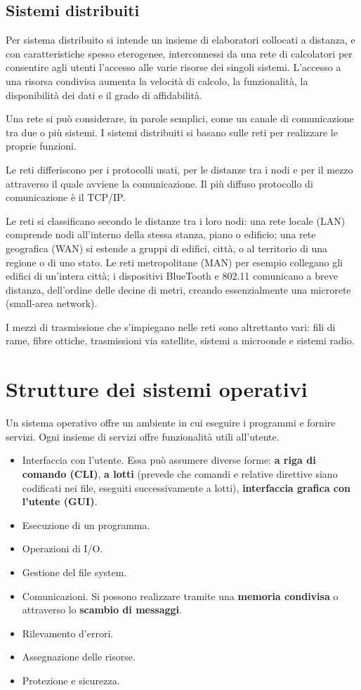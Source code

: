 \documentclass[11pt,a4paper]{article}
\begin{document}
\subsection{Sistemi distribuiti}
Per sistema distribuito si intende un insieme di elaboratori collocati a distanza, e con carat­teristiche spesso eterogenee, interconnessi da una rete di calcolatori per consentire agli uten­ti l'accesso alle varie risorse dei singoli sistemi. L'accesso a una risorsa condivisa aumenta la
velocità di calcolo, la funzionalità, la disponibilità dei dati e il grado di affidabilità.

Una rete si può considerare, in parole semplici, come un canale di comunicazione tra
due o più sistemi. I sistemi distribuiti si basano sulle reti per realizzare le proprie funzioni.

Le reti differiscono per i protocolli
usati, per le distanze tra i nodi e per il mezzo attraverso il quale avviene la comunicazione.
Il più diffuso pro­tocollo di comunicazione è il TCP/IP.

Le reti si classificano secondo le distanze tra i loro nodi: una rete locale (LAN) com­prende nodi all'interno della stessa stanza, piano o edificio; una rete geografica (WAN) si
estende a gruppi di edifici, città, o al territorio di una regione o di uno stato.
Le reti metropolitane
(MAN) per esempio collegano gli edifici di un'intera città; i dispositivi BlueTooth e 802.11
comunicano a breve distanza, dell'ordine delle decine di metri, creando essenzialmente una
microrete (small-area network).

I mezzi di trasmissione che s'impiegano nelle reti sono altrettanto vari: fili di rame, fi­bre ottiche, trasmissioni via satellite, sistemi a microonde e sistemi radio.

\section{Strutture dei sistemi operativi}
Un sistema operativo offre un ambiente in cui eseguire i programmi e fornire servizi.
Ogni insieme di servizi offre funzionalità utili all'utente.
\begin{itemize}[leftmargin=*]
  \item Interfaccia con l'utente. Essa può assumere diverse forme: \textbf{a riga di comando (CLI)}, \textbf{a lotti} (pre­vede che comandi e relative direttive siano codificati nei file, eseguiti successivamente a lotti), \textbf{interfaccia grafica con l'utente (GUI)}.
  \item Esecuzione di un programma.
  \item Operazioni di I/O.
  \item Gestione del file system.
  \item Comunicazioni. Si possono realizzare tramite una \textbf{memoria condivisa} o attraverso lo \textbf{scambio di messaggi}.
  \item Rilevamento d'errori.
  \item Assegnazione delle risorse.
  \item Protezione e sicurezza.
\end{itemize}
\end{document}
